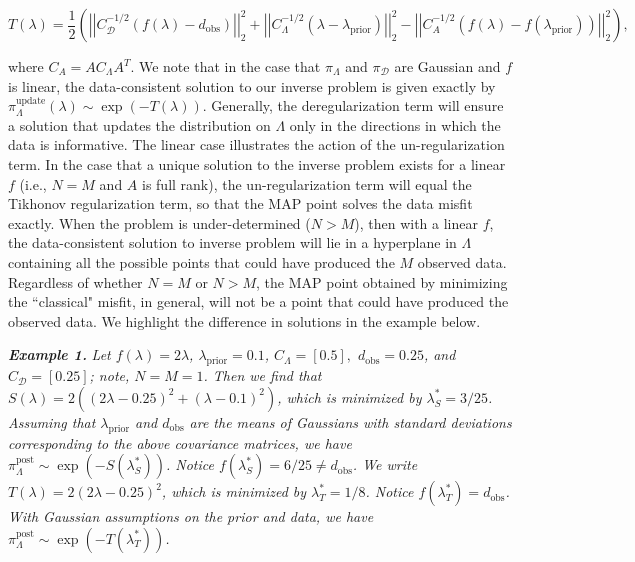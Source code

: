 \documentclass{amsart}
\begin{document}
\begin{equation} \label{eq:4}
T(\lambda)=\frac{1}{2}\left(\left|\left|C_\mathcal{D}^{-1/2}(f(\lambda)-d_{\text{obs}})\right|\right|_2^2+\left|\left|C_\Lambda^{-1/2}(\lambda-\lambda_{\text{prior}})\right|\right|_2^2-\left|\left|C_A^{-1/2}(f(\lambda)-f(\lambda_{\text{prior}}))\right|\right|_2^2\right),
\end{equation} 

\noindent where $C_A=AC_\Lambda A^T$. We note that in the case that $\pi_\Lambda$ and $\pi_\mathcal{D}$ are Gaussian and $f$ is linear, the data-consistent solution to our inverse problem is given exactly by $\pi_\Lambda^\text{update}(\lambda)\sim \exp(-T(\lambda))$. Generally, the deregularization term will ensure a solution that updates the distribution on $\Lambda$ only in the directions in which the data is informative. The linear case illustrates the action of the un-regularization term. In the case that a unique solution to the inverse problem exists for a linear $f$ (i.e., $N=M$ and $A$ is full rank), the un-regularization term will equal the Tikhonov regularization term, so that the MAP point solves the data misfit exactly. When the problem is under-determined ($N>M$), then with a linear $f$, the data-consistent solution to inverse problem will lie in a hyperplane in $\Lambda$ containing all the possible points that could have produced the $M$ observed data. Regardless of whether $N=M$ or $N>M$, the MAP point obtained by minimizing the ``classical" misfit, in general, will not be a point that could have produced the observed data. We highlight the difference in solutions in the example below.

\vspace{.125cm} 

\noindent \textbf{\textit{Example 1.}} \textit{Let $f(\lambda)=2\lambda$, $\lambda_\text{prior}=0.1$, $C_\Lambda=[0.5],$ $d_\text{obs}=0.25$, and $C_\mathcal{D}=[0.25]$; note, $N=M=1$. Then we find that $S(\lambda)=2((2\lambda-0.25)^2+(\lambda-0.1)^2)$, which is minimized by $\lambda^*_S=3/25$. Assuming that $\lambda_\text{prior}$ and $d_\text{obs}$ are the means of Gaussians with standard deviations corresponding to the above covariance matrices, we have $\pi_\Lambda^\text{post} \sim \exp(-S(\lambda_S^*))$. Notice $f(\lambda^*_S)=6/25\neq d_\text{obs}$. We write $T(\lambda)=2(2\lambda-0.25)^2$, which is minimized by $\lambda^*_T=1/8$. Notice $f(\lambda^*_T)=d_\text{obs}$. With Gaussian assumptions on the prior and data, we have $\pi_\Lambda^\text{post} \sim \exp(-T(\lambda_T^*))$.}
\end{document}
